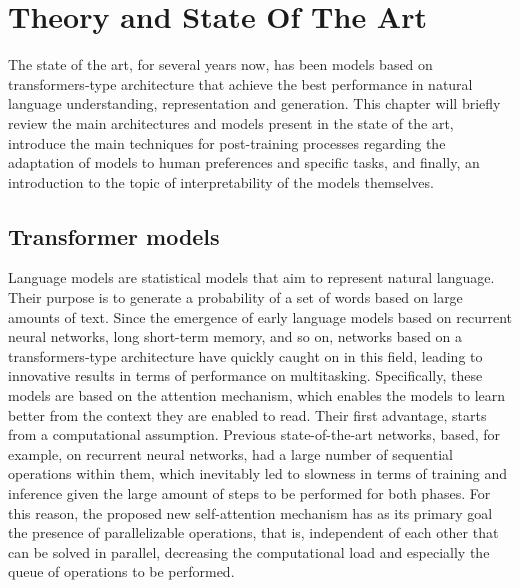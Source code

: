 \chapter{Theory and State Of The Art}
\label{chapter:SOTA}

The state of the art, for several years now, has been models based on transformers-type architecture \citep{DBLP:journals/corr/VaswaniSPUJGKP17} that achieve the best performance in natural language understanding, representation and generation. This chapter will briefly review the main architectures and models present in the state of the art, introduce the main techniques for post-training processes regarding the adaptation of models to human preferences and specific tasks, and finally, an introduction to the topic of interpretability of the models themselves.

\section {Transformer models} 

Language models are statistical models that aim to represent natural language. Their purpose is to generate a probability of a set of words based on large amounts of text. 
Since the emergence of early language models based on recurrent neural networks, long short-term memory, and so on, networks based on a transformers-type architecture have quickly caught on in this field, leading to innovative results in terms of performance on multitasking. Specifically, these models are based on the attention mechanism, which enables the models to learn better from the context they are enabled to read.
Their first advantage, starts from a computational assumption. Previous state-of-the-art networks, based, for example, on recurrent neural networks, had a large number of sequential operations within them, which inevitably led to slowness in terms of training and inference given the large amount of steps to be performed for both phases. For this reason, the proposed new self-attention mechanism has as its primary goal the presence of parallelizable operations, that is, independent of each other that can be solved in parallel, decreasing the computational load and especially the queue of operations to be performed.

